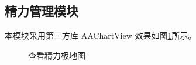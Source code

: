 \subsection{精力管理模块}
本模块采用第三方库 AAChartView 效果如图\ref{fig:energy}所示。

\begin{figure}[!htbp]
	\centering
	\caption{查看精力极地图}
	\label{fig:energy}
\end{figure}






